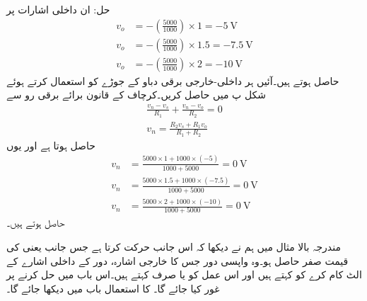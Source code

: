 حل:
ان داخلی اشارات پر
\begin{align*}
v_o&=-\left(\frac{5000}{1000}\right) \times 1=\SI{-5}{\volt}\\
 v_o&=-\left(\frac{5000}{1000}\right) \times 1.5=\SI{-7.5}{\volt}\\
v_o&=-\left(\frac{5000}{1000}\right) \times 2=\SI{-10}{\volt}
\end{align*}
حاصل ہوتے ہیں۔آئیں ہر داخلی-خارجی برقی دباو کے جوڑے کو استعمال کرتے ہوئے شکل  پ میں  حاصل کریں۔کرچاف کے قانون برائے برقی رو سے
\begin{align*}
\frac{v_n-v_s}{R_1}+\frac{v_n-v_o}{R_2}=0\\
v_n=\frac{R_2 v_s +R_1 v_o}{R_1+R_2}
\end{align*}
حاصل ہوتا ہے اور یوں
\begin{align*}
v_n&=\frac{5000 \times 1 +1000 \times (-5)}{1000+5000}=\SI{0}{\volt}\\
v_n&=\frac{5000 \times 1.5 +1000 \times (-7.5)}{1000+5000}=\SI{0}{\volt}\\
v_n&=\frac{5000 \times 2 +1000 \times (-10)}{1000+5000}=\SI{0}{\volt}
\end{align*}
حاصل ہوتے ہیں۔

مندرجہ بالا مثال میں ہم نے دیکھا کہ  اس جانب حرکت کرتا ہے جس جانب  یعنی  کی قیمت صفر حاصل ہو۔وہ واپسی دور جس کا خارجی اشارہ، دور کے داخلی اشارے کے الٹ کام کرے کو  کہتے ہیں اور اس عمل کو  یا صرف  کہتے ہیں۔اس باب میں  حل کرنے پر غور کیا جائے گا۔ کا استعمال باب  میں دیکھا جائے گا۔  
 
